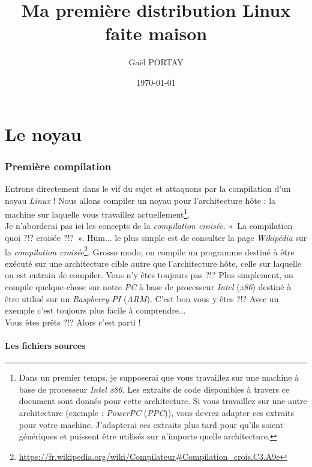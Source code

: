 \documentclass[a4paper]{article}
\title{Ma première distribution Linux faite maison}
\author{Gaël PORTAY}
\date{\today}
\begin{document}
\sloppy
\maketitle

\tableofcontents

\clearpage
\part{Le noyau}

\section{Première compilation}

Entrons directement dans le vif du sujet et attaquons par la compilation d'un noyau \textit{Linux} ! Nous allons compiler un noyau pour l'architecture hôte : la machine sur laquelle vous travaillez actuellement\footnote{Dans un premier temps, je supposerai que vous travaillez sur une machine à base de processeur \textit{Intel x86}. Les extraits de code disponibles à travers ce document sont donnés pour cette architecture. Si vous travaillez sur une autre architecture (exemple : \textit{PowerPC} (\textit{PPC})), vous devrez adapter ces extraits pour votre machine. J'adapterai ces extraits plus tard pour qu'ils soient génériques et puissent être utilisés sur n'importe quelle architecture.}.\\

Je n'aborderai pas ici les concepts de la \textit{compilation croisée}. «~La compilation quoi ?!? croisée ?!?~». Hum... le plus simple est de consulter la page \textit{Wikipédia} sur la \textit{compilation croisée}\footnote{\url{https://fr.wikipedia.org/wiki/Compilateur\#Compilation\_crois.C3.A9e}}. Grosso modo, on compile un programme destiné à être exécuté sur une architecture cible autre que l'architecture hôte, celle sur laquelle on est entrain de compiler. Vous n'y êtes toujours pas ?!? Plus simplement, on compile quelque-chose sur notre \textit{PC} à base de processeur \textit{Intel} (\textit{x86}) destiné à être utilisé sur un \textit{Raspberry-PI} (\textit{ARM}). C'est bon vous y êtes ?!? Avec un exemple c'est toujours plus facile à comprendre...\\

Vous êtes prêts ?!? Alors c'est parti !\\

\subsection{Les fichiers sources}
\end{document}
